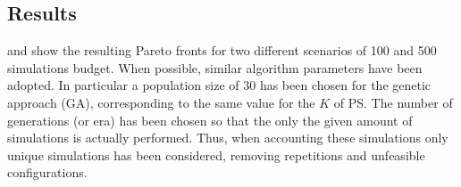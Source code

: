 \subsection{Results}

 and  show the resulting Pareto fronts for two
different scenarios of 100 and 500 simulations budget.  When possible,
similar algorithm parameters have been adopted. In particular a
population size of 30 has been chosen for the genetic approach (GA), corresponding to the
same value for the $K$ of PS.  The number of generations (or era)
has been chosen so that the only the given amount of simulations is
actually performed. Thus, when accounting these simulations only unique simulations
has been considered, removing repetitions and unfeasible
configurations.

%


